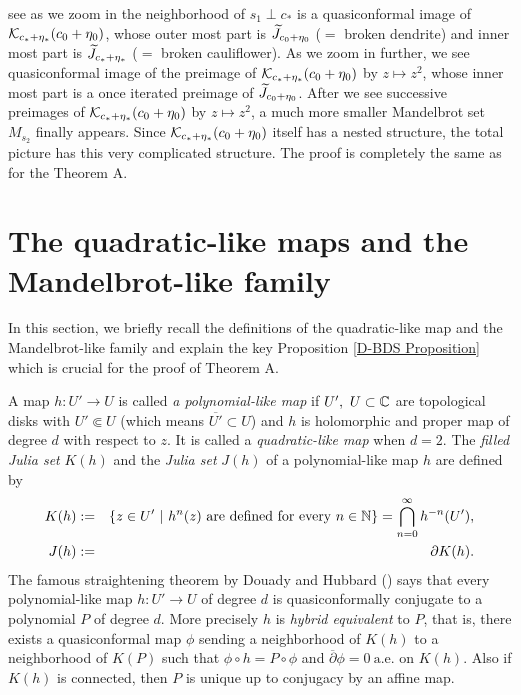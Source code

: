 \begin{rem*}
see as we zoom in the neighborhood of $s_1 \perp c_*$ is a quasiconformal image of
${\mathcal{K}}_{c_*+\eta_*}(c_0+\eta_0)$, whose outer most part is 
$\widetilde{J}_{c_0+\eta_0}$ ($=$ broken dendrite) and inner most part is 
$\widetilde{J}_{c_*+\eta_*}$ ($=$ broken cauliflower). As we zoom in further, 
we see quasiconformal image of the preimage of ${\mathcal{K}}_{c_*+\eta_*}(c_0+\eta_0)$ by 
$z \mapsto z^2$, whose inner most part is a once iterated preimage of 
$\widetilde{J}_{c_0+\eta_0}$. After we see successive preimages of 
${\mathcal{K}}_{c_*+\eta_*}(c_0+\eta_0)$ by $z \mapsto z^2$, a much more smaller Mandelbrot
set $M_{s_2}$ finally appears. Since ${\mathcal{K}}_{c_*+\eta_*}(c_0+\eta_0)$
itself has a nested structure, the total picture has this very 
complicated structure. The proof is completely the same as for the 
Theorem A. 
\end{rem*}








\section{The quadratic-like maps and the Mandelbrot-like family}

In this section, we briefly recall the definitions of the quadratic-like map and
the Mandelbrot-like family and explain the key Proposition \ref{D-BDS Proposition} 
which is crucial for the proof of Theorem A.


A map $h : U' \to U$ is called {\it a polynomial-like map} if
$U', \ U \subset \mathbb C$ are topological disks with $U' \Subset U$ (which means 
$\overline{U'} \subset U$) 
and $h$ is holomorphic and proper map of degree $d$ with respect to $z$. 
It is called a {\it quadratic-like map} when $d=2$.
The {\it filled Julia set} $K(h)$ and the {\it Julia set} $J(h)$ of a 
polynomial-like map $h$ are defined by
\begin{eqnarray*}
  K(h) 
& :=  &
\{ z \in U' \ | \ h^n(z) \text{ are defined for every } n \in \mathbb N \}
= \bigcap_{n=0}^\infty h^{-n}(U'), \\
  J(h)
& := &
\partial K(h).
\end{eqnarray*}
The famous straightening theorem by Douady and Hubbard 
(\cite[p.296, THEOREM 1]{Douady-Hubbard 1985}) says that
every polynomial-like map $h : U' \to U$ of degree $d$ is quasiconformally 
conjugate to a polynomial $P$ of degree $d$. More precisely $h$ is 
{\it hybrid equivalent} to $P$, that is, there exists a quasiconformal map
$\phi$ sending a neighborhood of $K(h)$ to a neighborhood of $K(P)$ such
that $\phi \circ h = P \circ \phi$ and $\overline{\partial} \phi = 0 \ \text{a.e.}$
on $K(h)$.
Also if $K(h)$ is connected, then $P$ is unique up to conjugacy by an affine map.


